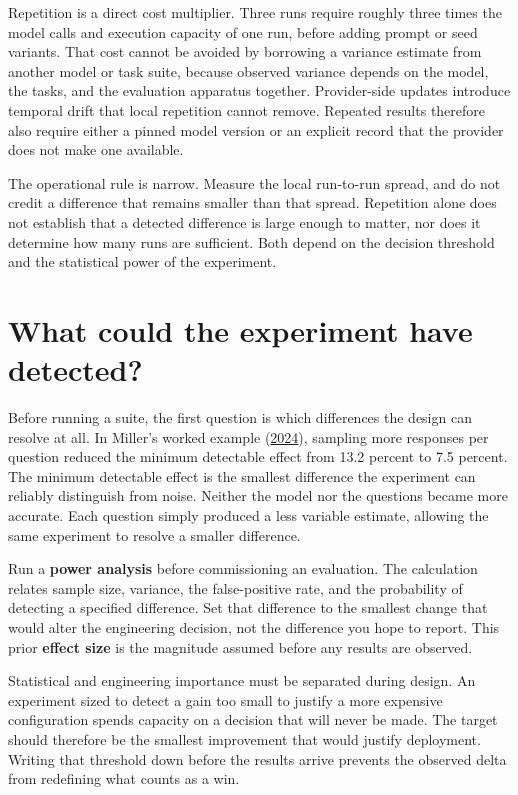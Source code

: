 Repetition is a direct cost multiplier. Three runs require roughly three times the model calls and execution capacity of one run, before adding prompt or seed variants. That cost cannot be avoided by borrowing a variance estimate from another model or task suite, because observed variance depends on the model, the tasks, and the evaluation apparatus together. Provider-side updates introduce temporal drift that local repetition cannot remove. Repeated results therefore also require either a pinned model version or an explicit record that the provider does not make one available.

The operational rule is narrow. Measure the local run-to-run spread, and do not credit a difference that remains smaller than that spread. Repetition alone does not establish that a detected difference is large enough to matter, nor does it determine how many runs are sufficient. Both depend on the decision threshold and the statistical power of the experiment.

\hypertarget{what-could-the-experiment-have-detected}{%
\section{What could the experiment have detected?}\label{what-could-the-experiment-have-detected}}

Before running a suite, the first question is which differences the design can resolve at all. In Miller's worked example (\href{https://arxiv.org/abs/2411.00640}{2024}), sampling more responses per question reduced the minimum detectable effect from 13.2 percent to 7.5 percent. The minimum detectable effect is the smallest difference the experiment can reliably distinguish from noise. Neither the model nor the questions became more accurate. Each question simply produced a less variable estimate, allowing the same experiment to resolve a smaller difference.

Run a \textbf{power analysis} before commissioning an evaluation. The calculation relates sample size, variance, the false-positive rate, and the probability of detecting a specified difference. Set that difference to the smallest change that would alter the engineering decision, not the difference you hope to report. This prior \textbf{effect size} is the magnitude assumed before any results are observed.

Statistical and engineering importance must be separated during design. An experiment sized to detect a gain too small to justify a more expensive configuration spends capacity on a decision that will never be made. The target should therefore be the smallest improvement that would justify deployment. Writing that threshold down before the results arrive prevents the observed delta from redefining what counts as a win.

